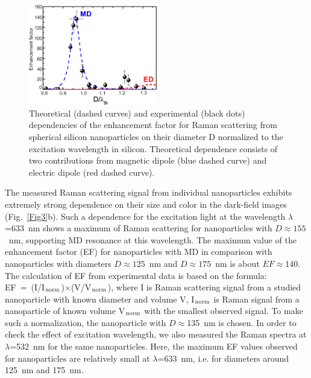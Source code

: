         \begin{figure}[!hb]
            \begin{center}
                \includegraphics[width=0.5\textwidth]{figs/results/enhance/EnhancementExperimentTheory.eps}
            \end{center}
            \label{fig:EnhancementExpTheory}
            \caption{Theoretical (dashed curves) and experimental (black dots) dependencies of the enhancement factor for Raman
            scattering from spherical silicon nanoparticles on their diameter D normalized to the excitation wavelength in silicon.
            Theoretical dependence consists of two contributions from magnetic dipole (blue dashed curve) and electric dipole
            (red dashed curve).}\label{Fig4}
        \end{figure}

        The measured Raman scattering signal from individual nanoparticles exhibits extremely strong dependence on their size
        and color in the dark-field images (Fig.~\ref{Fig3}b). Such a dependence for the excitation light at the wavelength
        $\lambda$=633~nm shows a maximum of Raman scattering for nanoparticles with $D\approx 155$~nm, supporting MD resonance
        at this wavelength. The maximum value of the enhancement factor (EF) for nanoparticles with MD in comparison with
        nanoparticles with diameters $D\approx125$~nm and $D\approx175$~nm is about $EF\approx$140. The calculation of EF
        from experimental data is based on the formula: EF~=~(I/I$_{\rm norm}$)$\times$(V/V$_{\rm norm}$), where I is Raman
        scattering signal from a studied nanoparticle with known diameter and volume V, I$_{\rm norm}$ is Raman signal from
        a nanoparticle of known volume V$_{\rm norm}$ with the smallest observed signal. To make such a normalization, the
        nanoparticle with $D\approx$135~nm is chosen. In order to check the effect of excitation wavelength, we also measured
        the Raman spectra at $\lambda$=532~nm for the same nanoparticles. Here, the maximum EF values observed for nanoparticles
         are relatively small at $\lambda$=633~nm, i.e. for diameters around 125~nm and 175~nm.

